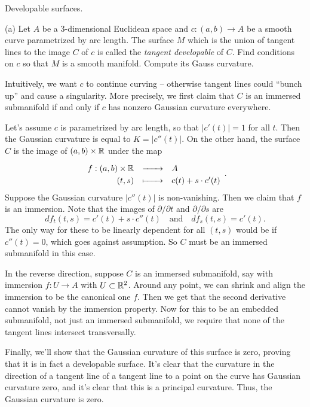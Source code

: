 \documentclass{../../templates/lkx_pset}
\begin{document}
\begin{problem}{3}
  Developable surfaces.
\end{problem}
\begin{parts}
  \begin{part}{(a)}
    Let $A$ be a $3$-dimensional Euclidean space and $c : (a,b) \to A$ be a smooth curve parametrized by arc length. The surface $M$ which is the union of tangent lines to the image $C$ of $c$ is called the \emph{tangent developable} of $C$. Find conditions on $c$ so that $M$ is a smooth manifold. Compute its Gauss curvature.
  \end{part}

  Intuitively, we want $c$ to continue curving -- otherwise tangent lines could ``bunch up'' and cause a singularity. More precisely, we first claim that $C$ is an immersed submanifold if and only if $c$ has nonzero Gaussian curvature everywhere.

  Let's assume $c$ is parametrized by arc length, so that $|c'(t)|=1$ for all $t$. Then the Gaussian curvature is equal to $K=|c''(t)|$. On the other hand, the surface $C$ is the image of $(a,b)\times \mathbb{R}$ under the map
  \[
    \definefunction{f}{(a,b)\times \R}{A}{(t,s)}{c(t)+s\cdot c'(t)}.
  \]
  Suppose the Gaussian curvature $|c''(t)|$ is non-vanishing. Then we claim that $f$ is an immersion. Note that the images of $\partial/\partial t$ and $\partial/\partial s$ are
  \[
    df_t(t,s) = c'(t)+s\cdot c''(t)\quad\textrm{and}\quad df_s(t,s)=c'(t).
  \]
  The only way for these to be linearly dependent for all $(t,s)$ would be if $c''(t)=0$, which goes against assumption. So $C$ must be an immersed submanifold in this case.

  In the reverse direction, suppose $C$ is an immersed submanifold, say with immersion $f : U \to A$ with $U\subset \mathbb{R}^2$. Around any point, we can shrink and align the immersion to be the canonical one $f$. Then we get that the second derivative cannot vanish by the immersion property. Now for this to be an embedded submanifold, not just an immersed submanifold, we require that none of the tangent lines intersect transversally.

  Finally, we'll show that the Gaussian curvature of this surface is zero, proving that it is in fact a developable surface. It's clear that the curvature in the direction of a tangent line of a tangent line to a point on the curve has Gaussian curvature zero, and it's clear that this is a principal curvature. Thus, the Gaussian curvature is zero.
\end{parts}
\end{document}
